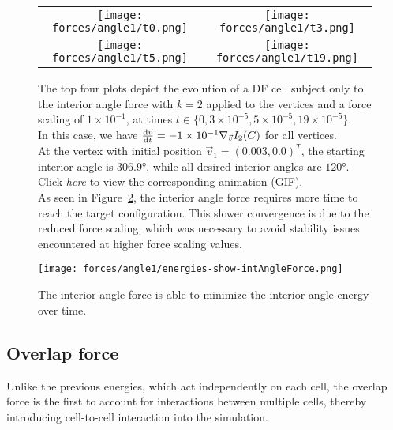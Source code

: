 \begin{figure}[h!]
    \centering
    \begin{tabular}{cc}
        \texttt{[image: forces/angle1/t0.png]} &
        \texttt{[image: forces/angle1/t3.png]} \\
        \texttt{[image: forces/angle1/t5.png]} &
        \texttt{[image: forces/angle1/t19.png]} \\
    \end{tabular}
    \caption{The top four plots depict the evolution of a DF cell subject only to the interior angle force with $k=2$ applied to the vertices and a force scaling of $1\times 10^{-1}$, at times $t \in \{0, 3\times 10^{-5}, 5\times 10^{-5}, 19\times 10^{-5}\}$.\\
			In this case, we have $\frac{\mathrm{d} \vec{v}}{\mathrm{d} t} = - 1\times 10^{-1} \nabla_{\vec{v}} I_2(C)$ for all vertices.\\
			At the vertex with initial position $\vec{v}_1 = (0.003, 0.0)^T$, the starting interior angle is $306.9°$, while all desired interior angles are $120°$.\\
			Click \href{https://github.com/tivo476c/FlexibleCellModel/blob/master/figures/gifs/showForces/show-intAngleForce.gif}{\textit{here}} to view the corresponding animation (GIF).\\
			As seen in Figure~\ref{fig:angleEnergyDiagram}, the interior angle force requires more time to reach the target configuration. 
			This slower convergence is due to the reduced force scaling, which was necessary to avoid stability issues encountered at higher force scaling values. }
	\label{fig:angleForce}
\end{figure}
\begin{figure}[h!]
    \centering
        \texttt{[image: forces/angle1/energies-show-intAngleForce.png]} 
    \caption{The interior angle force is able to minimize the interior angle energy over time.}
	\label{fig:angleEnergyDiagram}    
\end{figure}

\subsection{Overlap force}
Unlike the previous energies, which act independently on each cell, the overlap force is the first to account for interactions between multiple cells, thereby introducing cell-to-cell interaction into the simulation. \\

